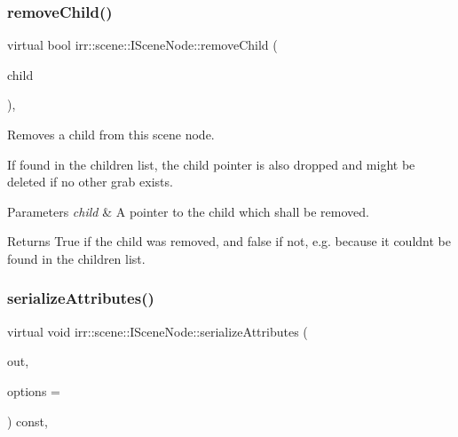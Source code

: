 \subsubsection{\texorpdfstring{remove\+Child()}{removeChild()}\hspace{0.1cm}{\footnotesize\ttfamily [2/2]}}
{\footnotesize\ttfamily virtual bool irr\+::scene\+::\+I\+Scene\+Node\+::remove\+Child (\begin{DoxyParamCaption}\item[{\hyperlink{classirr_1_1scene_1_1ISceneNode}{I\+Scene\+Node} $\ast$}]{child }\end{DoxyParamCaption})\hspace{0.3cm}{\ttfamily [inline]}, {\ttfamily [virtual]}}



Removes a child from this scene node. 

If found in the children list, the child pointer is also dropped and might be deleted if no other grab exists. 
\begin{DoxyParams}{Parameters}
{\em child} & A pointer to the child which shall be removed. \\
\hline
\end{DoxyParams}
\begin{DoxyReturn}{Returns}
True if the child was removed, and false if not, e.\+g. because it couldn\textquotesingle{}t be found in the children list. 
\end{DoxyReturn}
\mbox{\label{classirr_1_1scene_1_1ISceneNode_a3210345b70227c03c7f889c94754fdaa}} 
\subsubsection{\texorpdfstring{serialize\+Attributes()}{serializeAttributes()}\hspace{0.1cm}{\footnotesize\ttfamily [1/2]}}
{\footnotesize\ttfamily virtual void irr\+::scene\+::\+I\+Scene\+Node\+::serialize\+Attributes (\begin{DoxyParamCaption}\item[{\hyperlink{classirr_1_1io_1_1IAttributes}{io\+::\+I\+Attributes} $\ast$}]{out,  }\item[{\hyperlink{structirr_1_1io_1_1SAttributeReadWriteOptions}{io\+::\+S\+Attribute\+Read\+Write\+Options} $\ast$}]{options = {} }\end{DoxyParamCaption}) const\hspace{0.3cm}{\ttfamily [inline]}, {\ttfamily [virtual]}}



